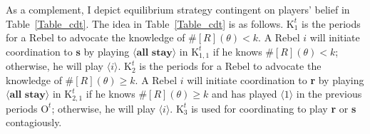 \documentclass[12pt,letter]{article}
\newcommand{\Kappa}{\mathrm{K}}
\newcommand{\Omicron}{\mathrm{O}}
\theoremstyle{definition}
\theoremstyle{remark}
\theoremstyle{claim}
\begin{document}
As a complement, I depict equilibrium strategy contingent on players' belief in Table~\ref{Table_cdt}. The idea in Table~\ref{Table_cdt} is as follows. $\Kappa^t_1$ is the periods for a Rebel to advocate the knowledge of $\# [R](\theta)<k$. A Rebel $i$ will initiate coordination to \textbf{s} by playing $\langle \textbf{all stay} \rangle$ in $\Kappa^t_{1,1}$ if he knows $\# [R](\theta)<k$; otherwise, he will play $\langle i \rangle$. $\Kappa^t_2$ is the periods for a Rebel to advocate the knowledge of $\# [R](\theta)\geq k$. A Rebel $i$ will initiate coordination to \textbf{r} by playing $\langle \textbf{all stay} \rangle$ in $\Kappa^t_{2,1}$ if he knows $\# [R](\theta)\geq k$ and has played $\langle 1 \rangle$ in the previous periods $\Omicron^t$; otherwise, he will play $\langle i \rangle$. $\Kappa^t_3$ is used for coordinating to play \textbf{r} or \textbf{s} contagiously.
\end{document}
